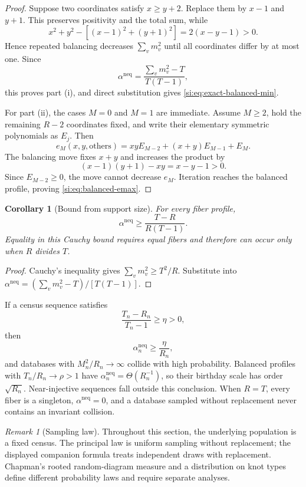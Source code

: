 \documentclass[9pt,twoside]{pnas-new}
\newtheorem{corollary}[theorem]{Corollary}
\theoremstyle{definition}
\theoremstyle{remark}
\newtheorem{remark}[theorem]{Remark}
\newcommand{\neqp}{\mathrm{neq}}
\begin{document}
\begin{proof}
Suppose two coordinates satisfy $x\ge y+2$.  Replace them by $x-1$ and $y+1$.  This preserves positivity and the total sum, while
\[
 x^2+y^2-[(x-1)^2+(y+1)^2]
 =2(x-y-1)>0.
\]
Hence repeated balancing decreases $\sum_vm_v^2$ until all coordinates differ by at most one.  Since
\[
 \alpha^{\neqp}=\frac{\sum_vm_v^2-T}{T(T-1)},
\]
this proves part (i), and direct substitution gives \eqref{si:eq:exact-balanced-min}.

For part (ii), the cases $M=0$ and $M=1$ are immediate. Assume $M\ge2$, hold the remaining $R-2$ coordinates fixed, and write their elementary symmetric polynomials as $E_j$.  Then
\[
 e_M(x,y,\text{others})
 =xyE_{M-2}+(x+y)E_{M-1}+E_M.
\]
The balancing move fixes $x+y$ and increases the product by
\[
 (x-1)(y+1)-xy=x-y-1>0.
\]
Since $E_{M-2}\ge0$, the move cannot decrease $e_M$.  Iteration reaches the balanced profile, proving \eqref{si:eq:balanced-emax}.
\end{proof}

\begin{corollary}[Bound from support size]
\label{si:cor:support-bound}
For every fiber profile,
\begin{equation}
 \alpha^{\neqp}
 \ge\frac{T-R}{R(T-1)}.
 \label{si:eq:support-bound}
\end{equation}
Equality in this Cauchy bound requires equal fibers and therefore can occur only when $R$ divides $T$.
\end{corollary}

\begin{proof}
Cauchy's inequality gives
$\sum_vm_v^2\ge T^2/R$.  Substitute into
$\alpha^{\neqp}=(\sum_vm_v^2-T)/[T(T-1)]$.
\end{proof}

If a census sequence satisfies
\[
 \frac{T_n-R_n}{T_n-1}\ge\eta>0,
\]
then
\[
 \alpha_n^{\neqp}\ge\frac{\eta}{R_n},
\]
and databases with $M_n^2/R_n\to\infty$ collide with high probability.  Balanced profiles with $T_n/R_n\to\rho>1$ have
$\alpha_n^{\neqp}=\Theta(R_n^{-1})$, so their birthday scale has order $\sqrt{R_n}$.  Near-injective sequences fall outside this conclusion.  When $R=T$, every fiber is a singleton, $\alpha^{\neqp}=0$, and a database sampled without replacement never contains an invariant collision.

\begin{remark}[Sampling law]
Throughout this section, the underlying population is a fixed census.  The principal law is uniform sampling without replacement; the displayed companion formula treats independent draws with replacement.  Chapman's rooted random-diagram measure and a distribution on knot types define different probability laws and require separate analyses.
\end{remark}
\end{document}
